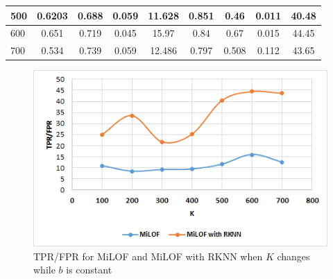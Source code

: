 \begin{table}[H]
\begin{tabular}{|l|c|c|c|c|c|c|c|c|}
		500                       & 0.6203                         & 0.688                              & 0.059                    & 11.628                       & 0.851                          & 0.46                               & 0.011                    & 40.48                        \\ \hline
		600                       & 0.651                          & 0.719                              & 0.045                    & 15.97                        & 0.84                           & 0.67                               & 0.015                    & 44.45                        \\ \hline
		700                       & 0.534                          & 0.739                              & 0.059                    & 12.486                       & 0.797                          & 0.508                              & 0.112                    & 43.65                        \\ \hline
	\end{tabular}
\end{table}



\begin{figure}[H]
	\centering
	\includegraphics{chap04/varyK2.png}
	\caption{TPR/FPR for MiLOF and MiLOF with RKNN when $K$ changes while $b$ is constant}
\end{figure}



